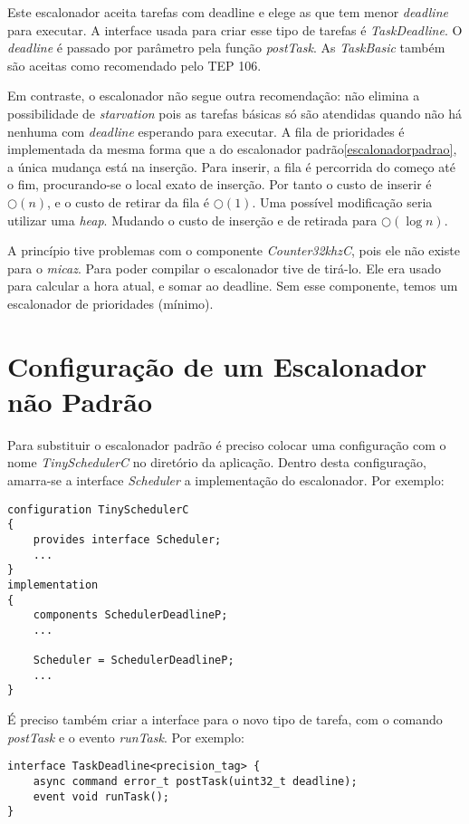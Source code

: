 \documentclass[a4paper,onecolumn, 10pt]{article}
\begin{document}
Este escalonador aceita tarefas com deadline e elege as que tem menor \textit{deadline} para executar. A interface usada para criar
esse tipo de tarefas é \textit{TaskDeadline}. O \textit{deadline} é passado por parâmetro pela função \textit{postTask}.
As \textit{TaskBasic} também são aceitas como recomendado pelo TEP
106\cite{tep106}.

Em contraste, o escalonador não segue outra recomendação: não elimina a possibilidade de \textit{starvation} pois as tarefas
básicas só são atendidas quando não há nenhuma com \textit{deadline} esperando para executar. A fila de prioridades é
implementada da mesma forma que a do escalonador padrão\ref{escalonadorpadrao}, a única mudança está na inserção. Para
inserir, a fila é percorrida do começo até o fim, procurando-se o local exato de inserção.
Por tanto o custo de inserir é $\bigcirc(n)$, e o custo de retirar da fila é $\bigcirc(1)$. 
Uma possível modificação seria utilizar uma \textit{heap}. Mudando o custo de inserção e de retirada para $\bigcirc(\log
n)$.

A princípio tive problemas com o componente \textit{Counter32khzC}, 
pois ele não existe para o \textit{micaz}. Para poder compilar o
escalonador tive de tirá-lo. Ele era usado para calcular a hora atual, e somar ao deadline. Sem esse componente, temos
um escalonador de prioridades (mínimo). 


\section{Configuração de um Escalonador não Padrão}\label{configescalonador_naopadrao}
Para substituir o escalonador padrão é preciso colocar uma configuração com o nome \textit{TinySchedulerC} no diretório
da aplicação. Dentro desta configuração, amarra-se a interface \textit{Scheduler} a implementação do escalonador. Por
exemplo:
\begin{lstlisting}
configuration TinySchedulerC 
{
    provides interface Scheduler;
    ...
}
implementation 
{
    components SchedulerDeadlineP;
    ...

    Scheduler = SchedulerDeadlineP;
    ...
}
\end{lstlisting}

É preciso também criar a interface para o novo tipo de tarefa, com o comando \textit{postTask} e o evento
\textit{runTask}. Por exemplo:
\begin{lstlisting}
interface TaskDeadline<precision_tag> { 
    async command error_t postTask(uint32_t deadline);
    event void runTask();
}
\end{lstlisting}
\end{document}
